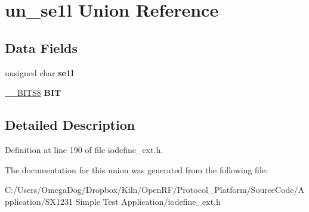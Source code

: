 \hypertarget{unionun__se1l}{\section{un\-\_\-se1l Union Reference}
\label{unionun__se1l}
}
\subsection*{Data Fields}
\begin{DoxyCompactItemize}
\item 
\hypertarget{unionun__se1l_a5866a0a3c419e39ca877d31de60a27ef}{unsigned char {\bfseries se1l}}\label{unionun__se1l_a5866a0a3c419e39ca877d31de60a27ef}

\item 
\hypertarget{unionun__se1l_ac4a3558a5873ebe6680902276ca597e5}{\hyperlink{struct_____b_i_t_s8}{\-\_\-\-\_\-\-B\-I\-T\-S8} {\bfseries B\-I\-T}}\label{unionun__se1l_ac4a3558a5873ebe6680902276ca597e5}

\end{DoxyCompactItemize}


\subsection{Detailed Description}


Definition at line 190 of file iodefine\-\_\-ext.\-h.



The documentation for this union was generated from the following file\-:\begin{DoxyCompactItemize}
\item 
C\-:/\-Users/\-Omega\-Dog/\-Dropbox/\-Kiln/\-Open\-R\-F/\-Protocol\-\_\-\-Platform/\-Source\-Code/\-Application/\-S\-X1231 Simple Test Application/iodefine\-\_\-ext.\-h\end{DoxyCompactItemize}
